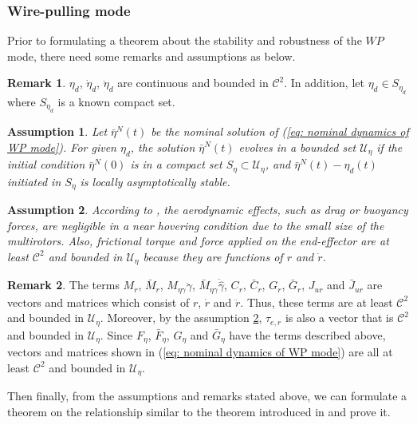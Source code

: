 \documentclass[letterpaper, 10 pt, conference]{ieeeconf}  %
\newtheorem{assumption}{Assumption}
\theoremstyle{definition}
\newtheorem{remark}{Remark}
\begin{document}
\subsubsection{Wire-pulling mode}
Prior to formulating a theorem about the stability and robustness of the $WP$ mode, there need some remarks and assumptions as below.
\begin{remark}
$\eta_d$, $\dot{\eta}_d$, $\ddot{\eta}_d$ are continuous and bounded in $\mathcal{C}^2$. In addition, let $\eta_d \in S_{\eta_d}$ where $S_{\eta_d}$ is a known compact set. 
\end{remark}
\begin{assumption}
Let $\bar{\eta}^N(t)$ be the nominal solution of (\ref{eq: nominal dynamics of WP mode}). For given $\eta_d$, the solution $\bar{\eta}^N(t)$ evolves in a bounded set $\mathcal{U}_{\eta}$ if the initial condition $\bar{\eta}^N(0)$ is in a compact set $S_{\eta} \subset \mathcal{U}_{\eta}$, and $\bar{\eta}^N(t) - \eta_d(t)$ initiated in $S_{\eta}$ is locally asymptotically stable.
\end{assumption}
\begin{assumption} \label{assumption on disturbance in wire-pulling mode}
According to \cite{kim2017robust}, the aerodynamic effects, such as drag or buoyancy forces, are negligible in a near hovering condition due to the small size of the multirotors. Also, frictional torque and force applied on the end-effector are at least $\mathcal{C}^2$ and bounded in $\mathcal{U}_{\eta}$ because they are functions of $r$ and $\dot{r}$.
\end{assumption}
\begin{remark} \label{remark: C^2 and boundedness of F,G}
The terms $M_r$, $\bar{M}_{r}$, $M_{\eta \gamma}\ddot{\gamma}$, $\bar{M}_{\eta \gamma}\ddot{\hat{\gamma}}$, $C_r$, $\bar{C}_{r}$, $G_r$, $\bar{G}_{r}$, $J_{u r}$ and $\bar{J}_{u r}$ are vectors and matrices which consist of $r$, $\dot{r}$ and $\ddot{r}$. Thus, these terms are at least $\mathcal{C}^2$ and bounded in $\mathcal{U}_{\eta}$. Moreover, by the assumption \ref{assumption on disturbance in wire-pulling mode}, $\tau_{e,r}$  is also a vector that is $\mathcal{C}^2$ and bounded in $\mathcal{U}_{\eta}$. Since $F_{\eta}$, $\bar{F}_{\eta}$, $G_{\eta}$ and $\bar{G}_{\eta}$ have the terms described above, vectors and matrices shown in (\ref{eq: nominal dynamics of WP mode}) are all at least $\mathcal{C}^2$ and bounded in $\mathcal{U}_{\eta}$.
\end{remark}
Then finally, from the assumptions and remarks stated above, we can formulate a theorem on the relationship similar to the theorem introduced in \cite{lee2020aerial_2} and prove it.
\end{document}
